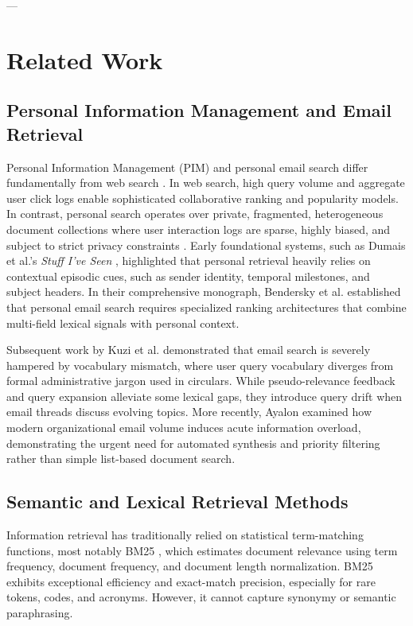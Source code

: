 \documentclass[11pt,a4paper]{article}
\begin{document}
---

\section{Related Work}

\subsection{Personal Information Management and Email Retrieval}
Personal Information Management (PIM) and personal email search differ fundamentally from web search \cite{dumais2003stuff, bendersky2020search}. In web search, high query volume and aggregate user click logs enable sophisticated collaborative ranking and popularity models. In contrast, personal search operates over private, fragmented, heterogeneous document collections where user interaction logs are sparse, highly biased, and subject to strict privacy constraints \cite{wang2016learning, bendersky2017learning, bendersky2020search}. Early foundational systems, such as Dumais et al.'s \textit{Stuff I've Seen} \cite{dumais2003stuff}, highlighted that personal retrieval heavily relies on contextual episodic cues, such as sender identity, temporal milestones, and subject headers. In their comprehensive monograph, Bendersky et al. \cite{bendersky2020search} established that personal email search requires specialized ranking architectures that combine multi-field lexical signals with personal context.

Subsequent work by Kuzi et al. \cite{kuzi2017query} demonstrated that email search is severely hampered by vocabulary mismatch, where user query vocabulary diverges from formal administrative jargon used in circulars. While pseudo-relevance feedback and query expansion alleviate some lexical gaps, they introduce query drift when email threads discuss evolving topics. More recently, Ayalon \cite{ayalon2025mediation} examined how modern organizational email volume induces acute information overload, demonstrating the urgent need for automated synthesis and priority filtering rather than simple list-based document search.

\subsection{Semantic and Lexical Retrieval Methods}
Information retrieval has traditionally relied on statistical term-matching functions, most notably BM25 \cite{robertson2009probabilistic}, which estimates document relevance using term frequency, document frequency, and document length normalization. BM25 exhibits exceptional efficiency and exact-match precision, especially for rare tokens, codes, and acronyms. However, it cannot capture synonymy or semantic paraphrasing.
\end{document}
